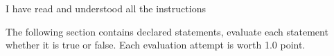 \documentclass[addpoints, 12pt]{exam}%
\newcommand{\tfscore}{1.0 }%
\newcommand{\totaltfscore}{5 }%
\begin{document}
\begin{titlepage}
	\vspace{1cm}
	
	\centering
	I have read and understood all the instructions\\
	\vspace{1cm}
	
	\vspace{1.25cm}
	
	
	
	
\end{titlepage}

\clearpage



\begin{questions}
	\bracketedpoints 


\question[\totaltfscore] The following section contains declared statements, evaluate each statement whether it is true or false. Each evaluation attempt is worth \tfscore point.\\ 
\end{questions}
\end{document}
